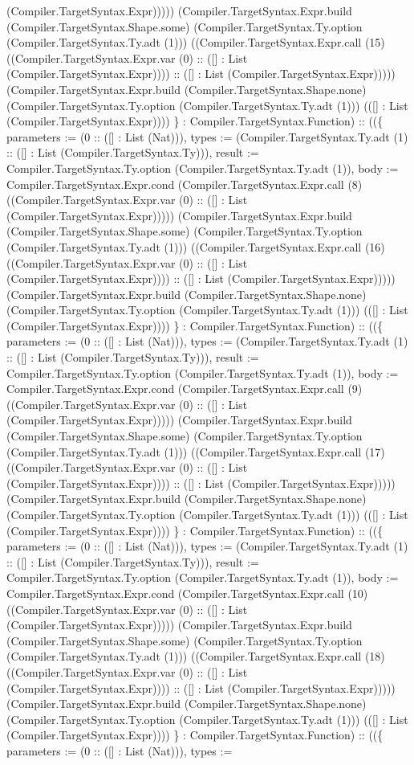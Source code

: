 \documentclass[11pt]{article}
\begin{document}
(Compiler.TargetSyntax.Expr))))) (Compiler.TargetSyntax.Expr.build (Compiler.TargetSyntax.Shape.some) (Compiler.TargetSyntax.Ty.option (Compiler.TargetSyntax.Ty.adt (1))) ((Compiler.TargetSyntax.Expr.call (15) ((Compiler.TargetSyntax.Expr.var (0) :: ([] : List (Compiler.TargetSyntax.Expr)))) :: ([] : List (Compiler.TargetSyntax.Expr))))) (Compiler.TargetSyntax.Expr.build (Compiler.TargetSyntax.Shape.none) (Compiler.TargetSyntax.Ty.option (Compiler.TargetSyntax.Ty.adt (1))) (([] : List (Compiler.TargetSyntax.Expr)))) \} : Compiler.TargetSyntax.Function) :: ((\{ parameters := (0 :: ([] : List (Nat))), types := (Compiler.TargetSyntax.Ty.adt (1) :: ([] : List (Compiler.TargetSyntax.Ty))), result := Compiler.TargetSyntax.Ty.option (Compiler.TargetSyntax.Ty.adt (1)), body := Compiler.TargetSyntax.Expr.cond (Compiler.TargetSyntax.Expr.call (8) ((Compiler.TargetSyntax.Expr.var (0) :: ([] : List (Compiler.TargetSyntax.Expr))))) (Compiler.TargetSyntax.Expr.build (Compiler.TargetSyntax.Shape.some) (Compiler.TargetSyntax.Ty.option (Compiler.TargetSyntax.Ty.adt (1))) ((Compiler.TargetSyntax.Expr.call (16) ((Compiler.TargetSyntax.Expr.var (0) :: ([] : List (Compiler.TargetSyntax.Expr)))) :: ([] : List (Compiler.TargetSyntax.Expr))))) (Compiler.TargetSyntax.Expr.build (Compiler.TargetSyntax.Shape.none) (Compiler.TargetSyntax.Ty.option (Compiler.TargetSyntax.Ty.adt (1))) (([] : List (Compiler.TargetSyntax.Expr)))) \} : Compiler.TargetSyntax.Function) :: ((\{ parameters := (0 :: ([] : List (Nat))), types := (Compiler.TargetSyntax.Ty.adt (1) :: ([] : List (Compiler.TargetSyntax.Ty))), result := Compiler.TargetSyntax.Ty.option (Compiler.TargetSyntax.Ty.adt (1)), body := Compiler.TargetSyntax.Expr.cond (Compiler.TargetSyntax.Expr.call (9) ((Compiler.TargetSyntax.Expr.var (0) :: ([] : List (Compiler.TargetSyntax.Expr))))) (Compiler.TargetSyntax.Expr.build (Compiler.TargetSyntax.Shape.some) (Compiler.TargetSyntax.Ty.option (Compiler.TargetSyntax.Ty.adt (1))) ((Compiler.TargetSyntax.Expr.call (17) ((Compiler.TargetSyntax.Expr.var (0) :: ([] : List (Compiler.TargetSyntax.Expr)))) :: ([] : List (Compiler.TargetSyntax.Expr))))) (Compiler.TargetSyntax.Expr.build (Compiler.TargetSyntax.Shape.none) (Compiler.TargetSyntax.Ty.option (Compiler.TargetSyntax.Ty.adt (1))) (([] : List (Compiler.TargetSyntax.Expr)))) \} : Compiler.TargetSyntax.Function) :: ((\{ parameters := (0 :: ([] : List (Nat))), types := (Compiler.TargetSyntax.Ty.adt (1) :: ([] : List (Compiler.TargetSyntax.Ty))), result := Compiler.TargetSyntax.Ty.option (Compiler.TargetSyntax.Ty.adt (1)), body := Compiler.TargetSyntax.Expr.cond (Compiler.TargetSyntax.Expr.call (10) ((Compiler.TargetSyntax.Expr.var (0) :: ([] : List (Compiler.TargetSyntax.Expr))))) (Compiler.TargetSyntax.Expr.build (Compiler.TargetSyntax.Shape.some) (Compiler.TargetSyntax.Ty.option (Compiler.TargetSyntax.Ty.adt (1))) ((Compiler.TargetSyntax.Expr.call (18) ((Compiler.TargetSyntax.Expr.var (0) :: ([] : List (Compiler.TargetSyntax.Expr)))) :: ([] : List (Compiler.TargetSyntax.Expr))))) (Compiler.TargetSyntax.Expr.build (Compiler.TargetSyntax.Shape.none) (Compiler.TargetSyntax.Ty.option (Compiler.TargetSyntax.Ty.adt (1))) (([] : List (Compiler.TargetSyntax.Expr)))) \} : Compiler.TargetSyntax.Function) :: ((\{ parameters := (0 :: ([] : List (Nat))), types := 
\end{document}
